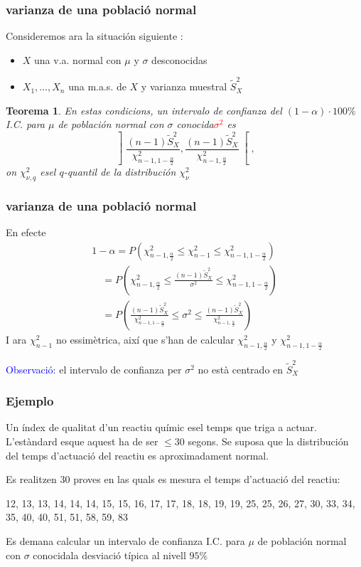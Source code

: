 \documentclass[12pt,t]{beamer}\usepackage[]{graphicx}\usepackage[]{color}
\newcommand{\red}[1]{\textcolor{red}{#1}}
\newcommand{\blue}[1]{\textcolor{blue}{#1}}
\renewcommand{\leq}{\leqslant}
\theoremstyle{plain}
\newtheorem{teorema}{Teorema}
\theoremstyle{definition}
\begin{document}
\begin{frame}
\frametitle{varianza de una població normal}


Consideremos ara la situación siguiente  :
\begin{itemize}
\item  $X$ una v.a. normal con $\mu$ y $\sigma$ desconocidas

\item $X_1,\ldots,X_n$ una m.a.s. de $X$ y varianza muestral $\widetilde{S}_X^2$
\end{itemize}


\begin{teorema}
En estas  condicions,  un intervalo  de confianza  del $(1-\alpha)\cdot 100\%$ I.C. para $\mu$ de población normal con $\sigma$ conocida\red{$\sigma^2$}
es 
$$
\left] \frac{(n-1)\widetilde{S}_{X}^2}{\chi_{n-1,1-\frac{\alpha}{2}}^2},
\frac{(n-1)\widetilde{S}_{X}^2}{\chi_{n-1,\frac{\alpha}{2}}^2}
\right[,
$$
on $\chi_{\nu,q}^2$ esel $q$-quantil de la distribución $\chi_{\nu}^2$
\end{teorema}
\end{frame}


\begin{frame}
\frametitle{varianza de una població normal}

En efecte
$$
\begin{array}{l}
1-\alpha=P\left(\chi_{n-1,\frac{\alpha}{2}}^2\leq \chi_{n-1}^2\leq
\chi_{n-1,1-\frac{\alpha}{2}}^2\right)\\[2ex]
\quad\displaystyle =P\left(\chi_{n-1,\frac{\alpha}{2}}^2\leq \frac{(n-1) \widetilde{S}_{X}^2}{\sigma^2}\leq
\chi_{n-1,1-\frac{\alpha}{2}}^2
\right)\\[2ex]
\quad\displaystyle = P\left(\frac{(n-1)
\widetilde{S}_{X}^2}{\chi_{n-1,1-\frac{\alpha}{2}}^2}\leq\sigma^2\leq\frac{
(n-1)\widetilde{S}_{X}^2}{\chi_{n-1,\frac{\alpha}{2}}^2}
\right)
\end{array}
$$
I ara $\chi_{n-1}^2$ no essimètrica, així que s'han de calcular $\chi_{n-1,\frac{\alpha}{2}}^2$ y $\chi_{n-1,1-\frac{\alpha}{2}}^2$
\medskip

\blue{Observació:} el intervalo de confianza  per $\sigma^2$ no està
centrado   en $\widetilde{S}_{X}^2$

\end{frame}


\begin{frame}
\frametitle{Ejemplo}

Un índex de qualitat d'un reactiu químic esel temps que triga a
actuar. L'estàndard esque aquest ha de ser $\leq 30$ segons.
Se suposa que la distribución del temps d'actuació del reactiu es 
aproximadament normal. 
\medskip


Es realitzen 30 proves en las quals es mesura el temps
d'actuació del reactiu:
\medskip

12, 13, 13, 14, 14, 14, 15, 15, 16, 17, 17, 18, 18, 19, 19, 25, 25, 26, 27, 30,
33, 34, 35, 40, 40, 51, 51, 58, 59, 83
\medskip

Es demana calcular un intervalo de confianza  I.C. para $\mu$ de población normal con $\sigma$ conocidala desviació típica al nivell
$95\%$
\end{frame}
\end{document}
